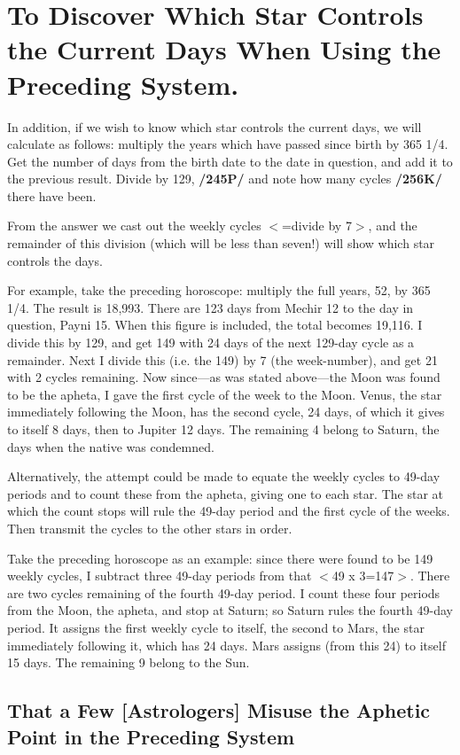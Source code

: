 \section{To Discover Which Star Controls the Current Days When Using the Preceding System.}

In addition, if we wish to know which star controls the current days, we will calculate as follows: multiply the years which have passed since birth by 365 1/4. Get the number of days from the birth date to
the date in question, and add it to the previous result. Divide by 129, \textbf{/245P/} and note how many cycles \textbf{/256K/} there have been. 

From the answer we cast out the weekly cycles $<$=divide by 7$>$, and the remainder of this division (which will be less than seven!) will show which star controls the days.

For example, take the preceding horoscope: multiply the full years, 52, by 365 1/4. The result is 18,993. There are 123 days from Mechir 12 to the day in question, Payni 15. When this figure is included, the total becomes 19,116. I divide this by 129, and get 149 with 24 days of the next 129-day cycle as a remainder. Next I divide this (i.e. the 149) by 7 (the week-number), and get 21 with 2 cycles remaining. Now since—as was stated above—the Moon was found to be the apheta, I gave the first cycle of the week to the Moon. Venus, the star immediately following the Moon, has the second cycle, 24 days, of which it gives to itself 8 days, then to Jupiter 12 days. The remaining 4 belong to Saturn, the days when the native was condemned.

Alternatively, the attempt could be made to equate the weekly cycles to 49-day periods and to count these from the apheta, giving one to each star. The star at which the count stops will rule the 49-day period and the first cycle of the weeks. Then transmit the cycles to the other stars in order. 

Take the preceding horoscope as an example: since there were found to be 149 weekly cycles, I subtract three 49-day periods from that $<$49 x 3=147$>$. There are two cycles remaining of the fourth 49-day period. I count these four periods from the Moon, the apheta, and stop at Saturn; so Saturn rules the fourth 49-day period. It assigns the first weekly cycle to itself, the second to Mars, the star immediately following it, which has 24 days. Mars assigns (from this 24) to itself 15 days. The remaining 9 belong to the Sun.

\subsection{That a Few [Astrologers] Misuse the Aphetic Point in the Preceding System}

